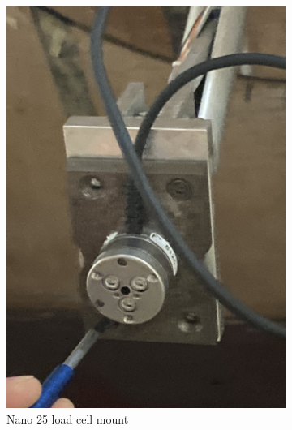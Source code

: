 \begin{figure}[H]
     \centering
     \begin{subfigure}[b]{0.45\textwidth}
               \centering
                \includegraphics[scale=0.06]{04_Methodology/Figs/loadCellMount}
                \caption{Nano 25 load cell mount}
                \label{fig:LoadCella}
     \end{subfigure}
     \hfill
     \begin{subfigure}[b]{0.45\textwidth}
                 \centering

\end{subfigure}
\end{figure}
